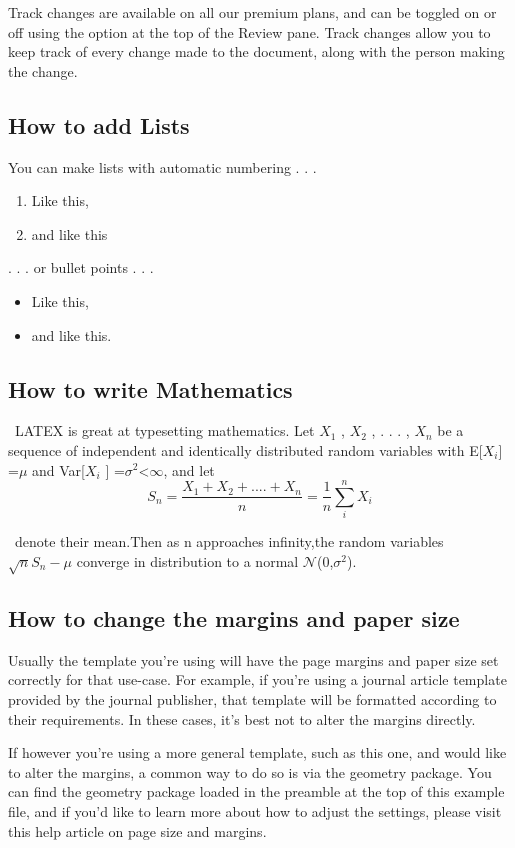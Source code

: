 \documentclass[10pt,english]{article}
\begin{document}
	Track changes are available on all our premium plans, and can be toggled on or off using the option
	at the top of the Review pane. Track changes allow you to keep track of every change made to the
	document, along with the person making the change.
	\subsection{How to add Lists}
	You can make lists with automatic numbering . . .
	\begin{enumerate}
		\item Like this,
		\item and like this
	\end{enumerate}
	. . . or bullet points . . .
	\begin{itemize}
		\item Like this,
		\item and like this.
	\end{itemize}	
\subsection{How to write Mathematics}\
LATEX is great at typesetting mathematics. Let $X_1$ , $X_2$ , . . . , $X_n$ be a sequence of independent and
identically distributed random variables with E[$X_i$] =$\mu$ and Var[$X_i$ ] =$\sigma^2$\textless$\infty$, and let
\[ S_n=\frac{X_1 + X_2 +....+ X_n}{n}= \frac{1}{n}\sum_{i}^{n} X_i\]

\	denote their mean.Then as n approaches infinity,the random variables
	\begin{math}	
			\sqrt{n}{S_n - \mu}
	\end{math}
converge in distribution to a normal $\mathcal{N}$(0,$\sigma^2$).
	\subsection{How to change the margins and paper size}
	Usually the template you’re using will have the page margins and paper size set correctly for that
	use-case. For example, if you’re using a journal article template provided by the journal publisher,
	that template will be formatted according to their requirements. In these cases, it’s best not to alter
	the margins directly.
	
	If however you’re using a more general template, such as this one, and would like to alter the
	margins, a common way to do so is via the geometry package. You can find the geometry package
	loaded in the preamble at the top of this example file, and if you’d like to learn more about how to
	adjust the settings, please visit this help article on page size and margins.
\end{document}
